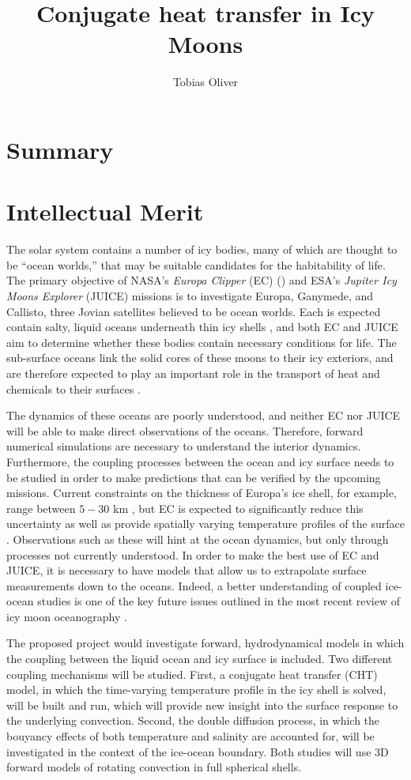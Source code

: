 \documentclass{article}
\title{Conjugate heat transfer in Icy Moons}
\author{Tobias Oliver}
\date{}
\begin{document}
\newcommand{\citep}[1]{\cite{#1}}
\maketitle
\section{Summary}
\section{Intellectual Merit}
The solar system contains a number of icy bodies, many of which are thought to be ``ocean worlds,'' that may be suitable candidates for the habitability of life.
The primary objective of NASA's \textit{Europa Clipper} (EC) (\cite{pC14_JUICE}) and ESA's \textit{Jupiter Icy Moons Explorer} (JUICE)\citep{oG13} missions is to investigate Europa, Ganymede, and Callisto, three Jovian satellites believed to be ocean worlds. Each is expected contain salty, liquid oceans underneath thin icy shells \citep{rP99,fN16}, and both EC and JUICE aim to determine whether these bodies contain necessary conditions for life\citep{tB24}.
The sub-surface oceans link the solid cores of these moons to their icy exteriors, and are therefore expected to play an important role in the transport of heat and chemicals to their surfaces \citep{kS20}. 

The dynamics of these oceans are poorly understood, and neither EC nor JUICE will be able to make direct observations of the oceans. 
Therefore, forward numerical simulations are necessary to understand the interior dynamics. 
Furthermore, the coupling processes between the ocean and icy surface needs to be studied in order to make predictions that can be verified by the upcoming missions.
Current constraints on the thickness of Europa's ice shell, for example, range between $5-30$ km \citep{sV18}, but EC is expected to significantly reduce this uncertainty as well as provide spatially varying temperature profiles of the surface \citep{kS20}. 
Observations such as these will hint at the ocean dynamics, but only through processes not currently understood. In order to make the best use of EC and JUICE, it is necessary to have models that allow us to extrapolate surface measurements down to the oceans.
Indeed, a better understanding of coupled ice-ocean studies is one of the key future issues outlined in the most recent review of icy moon oceanography \citep{kS24}. 

The proposed project would investigate forward, hydrodynamical models in which the coupling between the liquid ocean and icy surface is included. Two different coupling mechanisms will be studied. 
First, a conjugate heat transfer (CHT) model, in which the time-varying temperature profile in the icy shell is solved, will be built and run, which will provide new insight into the surface response to the underlying convection. Second, the double diffusion process, in which the bouyancy effects of both temperature and salinity are accounted for, will be investigated in the context of the ice-ocean boundary. Both studies will use 3D forward models of rotating convection in full spherical shells. 
\end{document}
